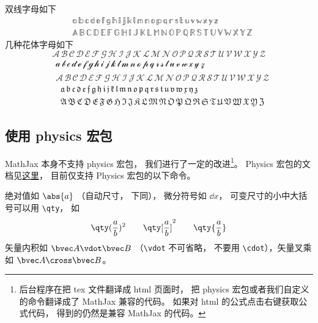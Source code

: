 双线字母如下
\begin{equation}
\begin{aligned}
&\mathbb{a\, b\, c\, d\, e\, f\, g\, h\, i\, j\, k\, l\, m\, n\, o\, p\, q\, r\, s\, t\, u\, v\, w\, x\, y\, z}\\
&\mathbb{A\, B\, C\, D\, E\, F\, G\, H\, I\, J\, K\, L\, M\, N\, O\, P\, Q\, R\, S\, T\, U\, V\, W\, X\, Y\, Z}
\end{aligned}
\end{equation}
几种花体字母如下
\begin{equation}
\mathcal{A\, B\, C\, D\, E\, F\, G\, H\, I\, J\, K\, L\, M\, N\, O\, P\, Q\, R\, S\, T\, U\, V\, W\, X\, Y\, Z}
\end{equation}
\begin{equation}
\begin{aligned}
&\mathscr{a\, b\, c\, d\, e\, f\, g\, h\, i\, j\, k\, l\, m\, n\, o\, p\, q\, r\, s\, t\, u\, v\, w\, x\, y\, z}\\
&\mathscr{A\, B\, C\, D\, E\, F\, G\, H\, I\, J\, K\, L\, M\, N\, O\, P\, Q\, R\, S\, T\, U\, V\, W\, X\, Y\, Z}
\end{aligned}
\end{equation}
\begin{equation}
\begin{aligned}
&\mathfrak{a\, b\, c\, d\, e\, f\, g\, h\, i\, j\, k\, l\, m\, n\, o\, p\, q\, r\, s\, t\, u\, v\, w\, x\, y\, z}\\
&\mathfrak{A\, B\, C\, D\, E\, F\, G\, H\, I\, J\, K\, L\, M\, N\, O\, P\, Q\, R\, S\, T\, U\, V\, W\, X\, Y\, Z}
\end{aligned}
\end{equation}

\subsection{使用 physics 宏包}
MathJax 本身不支持 physics 宏包， 我们进行了一定的改进\footnote{后台程序在把 tex 文件翻译成 html 页面时， 把 physics 宏包或者我们自定义的命令翻译成了 MathJax 兼容的代码。 如果对 html 的公式点击右键获取公式代码， 得到的仍然是兼容 MathJax 的代码。}。 Physics 宏包的文档见\href{http://mirrors.ibiblio.org/CTAN/macros/latex/contrib/physics/physics.pdf}{这里}， 目前仅支持 Physics 宏包的以下命令。

绝对值如 $\abs{a}$ （自动尺寸， 下同）， 微分符号如 $\dd{x}$， 可变尺寸的小中大括号可以用 \verb|\qty|， 如
\begin{equation}
\qty(\frac ab)^2 \qquad \qty[\frac ab]^2 \qquad \qty{ \frac ab}
\end{equation}
矢量内积如 $\bvec A \vdot \bvec B$ （\verb|\vdot| 不可省略， 不要用 \verb|\cdot|），矢量叉乘如 $\bvec A\cross\bvec B$。

